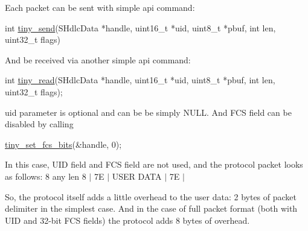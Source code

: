 Each packet can be sent with simple api command\+: 
\begin{DoxyCode}
\textcolor{keywordtype}{int} \hyperlink{group__SIMPLE__API_ga988a41addbe75dc15cc13006de6740e0}{tiny\_send}(SHdlcData *handle, uint16\_t *uid, uint8\_t *pbuf, \textcolor{keywordtype}{int} len, uint32\_t flags)
\end{DoxyCode}


And be received via another simple api command\+:


\begin{DoxyCode}
\textcolor{keywordtype}{int} \hyperlink{group__SIMPLE__API_ga470d59a60a496944e63031ba43a00e3d}{tiny\_read}(SHdlcData *handle, uint16\_t *uid, uint8\_t *pbuf, \textcolor{keywordtype}{int} len, uint32\_t flags);
\end{DoxyCode}


uid parameter is optional and can be be simply N\+U\+L\+L. And F\+C\+S field can be disabled by calling 
\begin{DoxyCode}
\hyperlink{group__ADVANCED__API_ga5e66725a2818491d4e2b1134951d9229}{tiny\_set\_fcs\_bits}(&handle, 0);
\end{DoxyCode}
 In this case, U\+I\+D field and F\+C\+S field are not used, and the protocol packet looks as follows\+: 8 any len 8 $\vert$ 7\+E $\vert$ U\+S\+E\+R D\+A\+T\+A $\vert$ 7\+E $\vert$

So, the protocol itself adds a little overhead to the user data\+: 2 bytes of packet delimiter in the simplest case. And in the case of full packet format (both with U\+I\+D and 32-\/bit F\+C\+S fields) the protocol adds 8 bytes of overhead. 